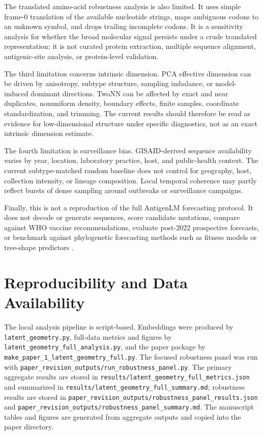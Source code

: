 \documentclass[11pt]{article}
\begin{document}
The translated amino-acid robustness analysis is also limited. It uses simple frame-0 translation of the available nucleotide strings, maps ambiguous codons to an unknown symbol, and drops trailing incomplete codons. It is a sensitivity analysis for whether the broad molecular signal persists under a crude translated representation; it is not curated protein extraction, multiple sequence alignment, antigenic-site analysis, or protein-level validation.

The third limitation concerns intrinsic dimension. PCA effective dimension can be driven by anisotropy, subtype structure, sampling imbalance, or model-induced dominant directions. TwoNN can be affected by exact and near duplicates, nonuniform density, boundary effects, finite samples, coordinate standardization, and trimming. The current results should therefore be read as evidence for low-dimensional structure under specific diagnostics, not as an exact intrinsic dimension estimate.

The fourth limitation is surveillance bias. GISAID-derived sequence availability varies by year, location, laboratory practice, host, and public-health context. The current subtype-matched random baseline does not control for geography, host, collection intensity, or lineage composition. Local temporal coherence may partly reflect bursts of dense sampling around outbreaks or surveillance campaigns.

Finally, this is not a reproduction of the full AntigenLM forecasting protocol. It does not decode or generate sequences, score candidate mutations, compare against WHO vaccine recommendations, evaluate post-2022 prospective forecasts, or benchmark against phylogenetic forecasting methods such as fitness models or tree-shape predictors \cite{luksza2014fitness,neher2014predicting,hadfield2018nextstrain}.

\section{Reproducibility and Data Availability}

The local analysis pipeline is script-based. Embeddings were produced by \texttt{latent\_geometry.py}, full-data metrics and figures by \texttt{latent\_geometry\_full\_analysis.py}, and the paper package by \texttt{make\_paper\_1\_latent\_geometry\_full.py}. The focused robustness panel was run with \texttt{paper\_revision\_outputs/run\_robustness\_panel.py}. The primary aggregate results are stored in \texttt{results/latent\_geometry\_full\_metrics.json} and summarized in \texttt{results/latent\_geometry\_full\_summary.md}; robustness results are stored in \texttt{paper\_revision\_outputs/robustness\_panel\_results.json} and \texttt{paper\_revision\_outputs/robustness\_panel\_summary.md}. The manuscript tables and figures are generated from aggregate outputs and copied into the paper directory.
\end{document}

